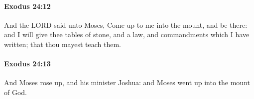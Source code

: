 		\paragraph{Exodus 24:12} %
			\label{EXODUS-24-12}

			And the LORD said unto Moses, Come up to me into the mount, and be there: and I will give thee tables of stone, and a law, and commandments which I have written; that thou mayest teach them.


		\paragraph{Exodus 24:13} %
			\label{EXODUS-24-13}

			And Moses rose up, and his minister Joshua: and Moses went up into the mount of God.


